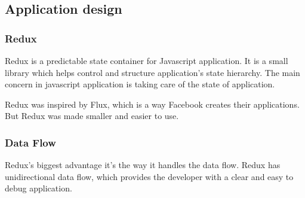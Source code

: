 \documentclass[thesis=M,english]{FITthesis}[2012/10/20]
\begin{document}
\subsection{Application design}



\subsubsection{Redux}
Redux is a predictable state container for Javascript application. It is a small library which helps control and structure application's state hierarchy. The main concern in javascript application is taking care of the state of application. 

Redux was inspired by Flux, which is a way Facebook creates their applications. But Redux was made smaller and easier to use.  %

\subsubsection{Data Flow}
Redux's biggest advantage it's the way it handles the data flow. Redux has unidirectional data flow, which provides the developer with a clear and easy to debug application.
\end{document}

